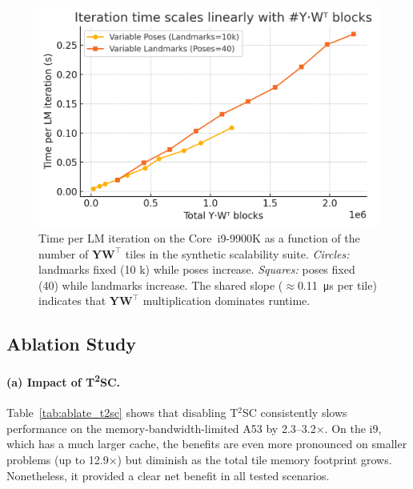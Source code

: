 \begin{figure}[!htbp]
  \centering
  \includegraphics[width=\linewidth]{figs/synth_scaling_YWt}
  \caption{Time per LM iteration on the Core~i9-9900K as a
    function of the number of $\mathbf Y\mathbf W^{\!\top}$ tiles
    in the synthetic scalability suite.  \emph{Circles:} landmarks
    fixed (10 k) while poses increase.  \emph{Squares:} poses fixed
    (40) while landmarks increase. The shared slope
    ($\approx$\SI{0.11}{\micro\second} per tile) indicates that
    $\mathbf{Y}\mathbf{W}^{\!\top}$ multiplication dominates runtime.}
  \label{fig:results_scaling_synth}
\end{figure}

\subsection{Ablation Study}
\label{subsec:results_ablation}

\paragraph{(a) Impact of T\textsuperscript{2}SC.} Table~\ref{tab:ablate_t2sc} shows that disabling 
T$^{2}$SC consistently slows performance on the memory-bandwidth-limited A53 by 2.3–3.2$\times$. 
On the i9, which has a much larger cache, the benefits are even more pronounced on smaller 
problems (up to 12.9$\times$) but diminish as the total tile memory footprint grows. Nonetheless, 
it provided a clear net benefit in all tested scenarios.


